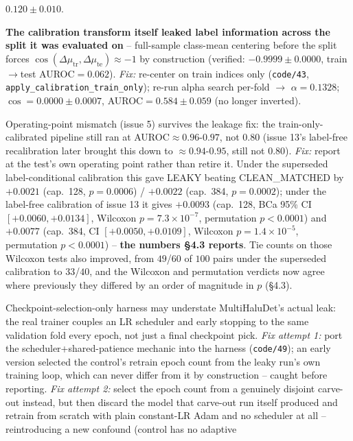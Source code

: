 \documentclass[10pt]{article} %
\begin{document}
\begin{description}
  $0.120\pm0.010$.
\item[8.] \textbf{The calibration transform itself leaked label
  information across the split it was evaluated on} -- full-sample
  class-mean centering before the split forces
  $\cos(\Delta\mu_{\text{tr}},\Delta\mu_{\text{te}})\approx-1$ by
  construction (verified: $-0.9999\pm0.0000$, train$\to$test
  AUROC$=0.062$). \textit{Fix:} re-center on train indices only
  (\texttt{code/43}, \texttt{apply\_calibration\_train\_only}); re-run
  alpha search per-fold $\rightarrow$ $\alpha=0.1328$;
  $\cos=0.0000\pm0.0007$, AUROC$=0.584\pm0.059$ (no longer inverted).
\item[9.] Operating-point mismatch (issue 5) survives the leakage fix:
  the train-only-calibrated pipeline still ran at
  AUROC$\approx0.96$-$0.97$, not $0.80$ (issue 13's label-free
  recalibration later brought this down to $\approx0.94$-$0.95$, still
  not $0.80$). \textit{Fix:} report at the test's own operating point
  rather than retire it. Under the superseded label-conditional
  calibration this gave LEAKY beating CLEAN\_MATCHED by $+0.0021$
  (cap.\ 128, $p=0.0006$) / $+0.0022$ (cap.\ 384, $p=0.0002$); under the
  label-free calibration of issue 13 it gives $+0.0093$ (cap.\ 128, BCa
  95\% CI $[+0.0060,+0.0134]$, Wilcoxon $p=7.3\times10^{-7}$,
  permutation $p<0.0001$) and $+0.0077$ (cap.\ 384, CI
  $[+0.0050,+0.0109]$, Wilcoxon $p=1.4\times10^{-5}$, permutation
  $p<0.0001$) -- \textbf{the numbers §4.3 reports}. Tie counts on those
  Wilcoxon tests also improved, from $49$/$60$ of $100$ pairs under the
  superseded calibration to $33$/$40$, and the Wilcoxon and permutation
  verdicts now agree where previously they differed by an order of
  magnitude in $p$ (§4.3).
\item[10.] Checkpoint-selection-only harness may understate
  MultiHaluDet's actual leak: the real trainer couples an LR scheduler
  and early stopping to the same validation fold every epoch, not just a
  final checkpoint pick. \textit{Fix attempt 1:} port the
  scheduler+shared-patience mechanic into the harness (\texttt{code/49});
  an early version selected the control's retrain epoch count from the
  leaky run's own training loop, which can never differ from it by
  construction -- caught before reporting. \textit{Fix attempt 2:} select
  the epoch count from a genuinely disjoint carve-out instead, but then
  discard the model that carve-out run itself produced and retrain from
  scratch with plain constant-LR Adam and no scheduler at all --
  reintroducing a new confound (control has no adaptive

\end{description}
\end{document}
